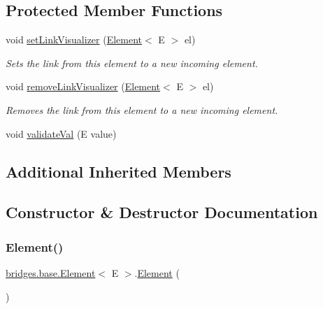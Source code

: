 \subsection*{Protected Member Functions}
\begin{DoxyCompactItemize}
\item 
void \hyperlink{classbridges_1_1base_1_1_element_af6251f52b9d277dd77e3bab1829d0197}{set\+Link\+Visualizer} (\hyperlink{classbridges_1_1base_1_1_element}{Element}$<$ E $>$ el)
\begin{DoxyCompactList}\small\item\em Sets the link from this element to a new incoming element. \end{DoxyCompactList}\item 
void \hyperlink{classbridges_1_1base_1_1_element_a144cd54e043a801fab326769a5da01e2}{remove\+Link\+Visualizer} (\hyperlink{classbridges_1_1base_1_1_element}{Element}$<$ E $>$ el)
\begin{DoxyCompactList}\small\item\em Removes the link from this element to a new incoming element. \end{DoxyCompactList}\item 
void \hyperlink{classbridges_1_1base_1_1_element_af1a60f4e6a91d379179f7d56e6dc3829}{validate\+Val} (E value)
\end{DoxyCompactItemize}
\subsection*{Additional Inherited Members}


\subsection{Constructor \& Destructor Documentation}
\mbox{\label{classbridges_1_1base_1_1_element_aa5fc5728f2ed4b041118a77409442390}} 
\subsubsection{\texorpdfstring{Element()}{Element()}\hspace{0.1cm}{\footnotesize\ttfamily [1/4]}}
{\footnotesize\ttfamily \hyperlink{classbridges_1_1base_1_1_element}{bridges.\+base.\+Element}$<$ E $>$.\hyperlink{classbridges_1_1base_1_1_element}{Element} (\begin{DoxyParamCaption}{ }\end{DoxyParamCaption})}



